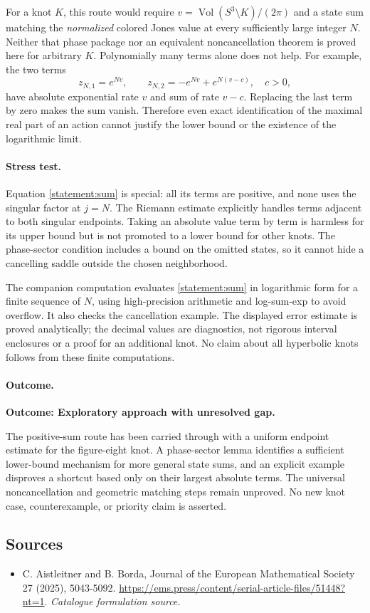 \documentclass[11pt,a4paper]{article}
\numberwithin{equation}{section}
\begin{document}
For a knot $K$, this route would require $v=\operatorname{Vol}(S^3
\setminus K)/(2\pi)$ and a state sum matching the \emph{normalized}
colored Jones value at every sufficiently large integer $N$.  Neither
that phase package nor an equivalent noncancellation theorem is proved
here for arbitrary $K$.  Polynomially many terms alone does not help.
For example, the two terms
\[
 z_{N,1}=e^{Nv},\qquad z_{N,2}=-e^{Nv}+e^{N(v-c)},\quad c>0,
\]
have absolute exponential rate $v$ and sum of rate $v-c$.
Replacing the last term by zero makes the sum vanish.  Therefore even
exact identification of the maximal real part of an action cannot
justify the lower bound or the existence of the logarithmic limit.

\paragraph{Stress test.}
Equation \eqref{statement:sum} is special: all its terms are positive, and none
uses the singular factor at $j=N$.  The Riemann estimate explicitly
handles terms adjacent to both singular endpoints.  Taking an absolute
value term by term is harmless for its upper bound but is not promoted
to a lower bound for other knots.  The phase-sector condition includes
a bound on the omitted states, so it cannot hide a cancelling saddle
outside the chosen neighborhood.

The companion computation evaluates \eqref{statement:sum} in logarithmic
form for a finite sequence of $N$, using high-precision arithmetic and
log-sum-exp to avoid overflow.  It also checks the cancellation example.
The displayed error estimate is proved analytically; the decimal
values are diagnostics, not rigorous interval enclosures or a proof
for an additional knot.  No claim about all hyperbolic knots follows
from these finite computations.

\paragraph{Outcome.}
\textbf{Outcome: Exploratory approach with unresolved gap.}

The positive-sum route has been carried through with a uniform endpoint
estimate for the figure-eight knot.  A phase-sector lemma identifies a
sufficient lower-bound mechanism for more general state sums, and an
explicit example disproves a shortcut based only on their largest
absolute terms.  The universal noncancellation and geometric matching
steps remain unproved.  No new knot case, counterexample, or priority
claim is asserted.
\subsection{Sources}
\begin{itemize}\raggedright
\item[\textnormal{[S1]}]\hypertarget{source:statement:1}{} C. Aistleitner and B. Borda, Journal of the European Mathematical Society 27 (2025), 5043-5092.
\url{https://ems.press/content/serial-article-files/51448?nt=1}.
{\small\textit{Catalogue formulation source.}}
\end{itemize}
\end{document}
